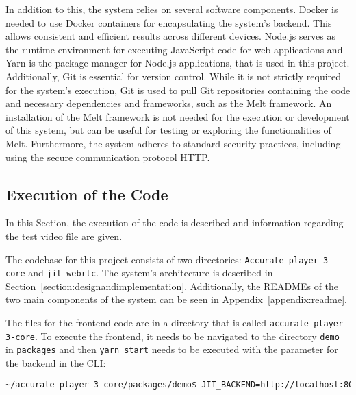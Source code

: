 \documentclass[../MasterThesis.tex]{subfiles}
\begin{document}
In addition to this, the system relies on several software components.
Docker is needed to use Docker containers for encapsulating the system's backend. This allows consistent and efficient results across different devices.
Node.js serves as the runtime environment for executing JavaScript code for web applications and Yarn is the package manager for Node.js applications, that is used in this project.
Additionally, Git is essential for version control. While it is not strictly required for the system's execution, Git is used to pull Git repositories containing the code and necessary dependencies and frameworks, such as the Melt framework. 
An installation of the Melt framework is not needed for the execution or development of this system, but can be useful for testing or exploring the functionalities of Melt.
%
Furthermore, the system adheres to standard security practices, including using the secure communication protocol HTTP.


	
	
	
	
	
	








\subsection{Execution of the Code} \label{subsection:runninghtecode}

In this Section, the execution of the code is described and information regarding the test video file are given.

The codebase for this project consists of two directories: \texttt{Accurate-player-3-core} and \texttt{jit-webrtc}. The system's architecture is described in Section~\ref{section:designandimplementation}. Additionally, the READMEs of the two main components of the system can be seen in Appendix~\ref{appendix:readme}.


The files for the frontend code are in a directory that is called \texttt{accurate-player-3-core}. To execute the frontend, it needs to be navigated to the directory \texttt{demo} in \texttt{packages} and then \texttt{yarn start} needs to be executed with the parameter for the backend in the CLI:
\begin{lstlisting}[language=bash, numbers=none, columns=fullflexible]
	~/accurate-player-3-core/packages/demo$ JIT_BACKEND=http://localhost:8080 yarn start
\end{lstlisting}
\end{document}
